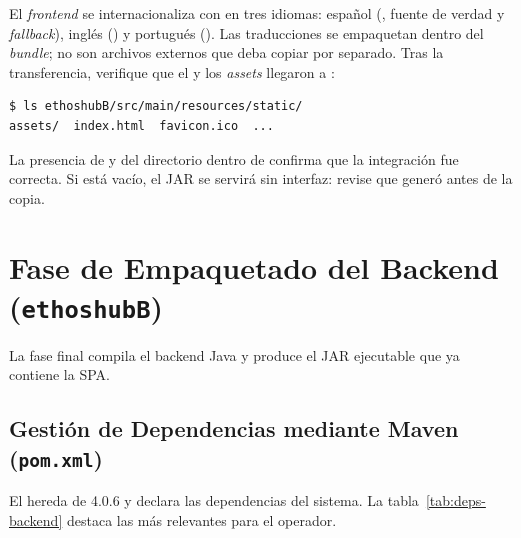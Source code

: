 El \textit{frontend} se internacionaliza con  en tres idiomas: español
(, fuente de verdad y \textit{fallback}), inglés () y portugués
(). Las traducciones se empaquetan dentro del \textit{bundle}; no son archivos
externos que deba copiar por separado. Tras la transferencia, verifique que el
 y los \textit{assets} llegaron a :\par

\begin{lstlisting}[language=bash]
$ ls ethoshubB/src/main/resources/static/
assets/  index.html  favicon.ico  ...
\end{lstlisting}

\begin{VerificacionOK}
La presencia de  y del directorio  dentro de
 confirma que la integración fue correcta. Si  está
vacío, el JAR se servirá sin interfaz: revise que  generó
 antes de la copia.
\end{VerificacionOK}

\section{Fase de Empaquetado del Backend (\texttt{ethoshubB})}%
\label{sec:empaquetado}

La fase final compila el backend Java y produce el JAR ejecutable que ya contiene la SPA.\par

\subsection{Gestión de Dependencias mediante Maven (\texttt{pom.xml})}%
\label{subsec:maven}

El  hereda de  4.0.6 y declara las
dependencias del sistema. La tabla~\ref{tab:deps-backend} destaca las más relevantes para
el operador.\par

